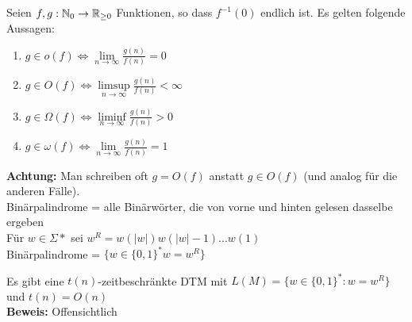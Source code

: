 \begin{bem}
	Seien $f, g : \mathbb{N}_0 \to \mathbb{R}_{\geq 0}$ Funktionen, so dass $f^{-1}(0)$ endlich ist. Es gelten folgende Aussagen:
	\begin{enumerate}[label=(\roman*)]
    		\item $g \in o(f) \iff \underset{n \to \infty}{\lim} \frac{g(n)}{f(n)} = 0$
    		\item $g \in O(f) \iff \underset{n \to \infty}{\limsup} \frac{g(n)}{f(n)} < \infty$
    		\item $g \in \Omega(f) \iff \underset{n \to \infty}{\liminf} \frac{g(n)}{f(n)} > 0$
    		\item $g \in \omega(f) \iff \underset{n \to \infty}{\lim} \frac{g(n)}{f(n)} = 1$
	\end{enumerate}
	
	\textbf{Achtung:} Man schreiben oft $g = O(f)$ anstatt $g \in O(f)$ (und analog für die anderen Fälle).\\
	
	Binärpalindrome = alle Binärwörter, die von vorne und hinten gelesen dasselbe ergeben\\
	Für $w \in \Sigma*$ sei $w^R = w(|w|) w(|w|-1) ... w(1)$\\
	Binärpalindrome = $\{w \in \{0, 1\}^* w = w^R\}$
\end{bem}


\begin{prop}{}
    Es gibt eine $t(n)$-zeitbeschränkte DTM mit $L(M) = \{w \in \{0, 1\}^* : w = w^R\}$ und $t(n) = O(n)$\\
    
    \textbf{Beweis:} Offensichtlich
\end{prop}

